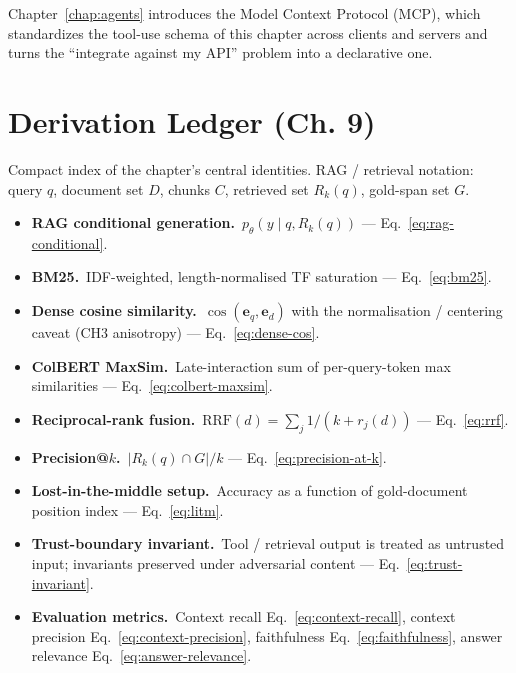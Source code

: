 Chapter~\ref{chap:agents} introduces the Model Context Protocol (MCP), which
standardizes the tool-use schema of this chapter across clients
and servers and turns the ``integrate against my API'' problem
into a declarative one.

\section*{Derivation Ledger (Ch. 9)}

\begin{derivledger}
Compact index of the chapter's central identities. RAG / retrieval
notation: query $q$, document set $D$, chunks $C$, retrieved set
$R_k(q)$, gold-span set $G$.
\begin{itemize}
  \item \textbf{RAG conditional generation.}\
        $p_\theta(y \mid q, R_k(q))$
        --- Eq.~\eqref{eq:rag-conditional}.
  \item \textbf{BM25.}\
        IDF-weighted, length-normalised TF saturation
        --- Eq.~\eqref{eq:bm25}.
  \item \textbf{Dense cosine similarity.}\
        $\cos(\mathbf{e}_q, \mathbf{e}_d)$ with the
        normalisation / centering caveat (CH3 anisotropy)
        --- Eq.~\eqref{eq:dense-cos}.
  \item \textbf{ColBERT MaxSim.}\
        Late-interaction sum of per-query-token max similarities
        --- Eq.~\eqref{eq:colbert-maxsim}.
  \item \textbf{Reciprocal-rank fusion.}\
        $\mathrm{RRF}(d) = \sum_{j} 1 / (k + r_j(d))$
        --- Eq.~\eqref{eq:rrf}.
  \item \textbf{Precision@$k$.}\
        $|R_k(q) \cap G| / k$
        --- Eq.~\eqref{eq:precision-at-k}.
  \item \textbf{Lost-in-the-middle setup.}\
        Accuracy as a function of gold-document position index
        --- Eq.~\eqref{eq:litm}.
  \item \textbf{Trust-boundary invariant.}\
        Tool / retrieval output is treated as untrusted input;
        invariants preserved under adversarial content
        --- Eq.~\eqref{eq:trust-invariant}.
  \item \textbf{Evaluation metrics.}\
        Context recall Eq.~\eqref{eq:context-recall},
        context precision Eq.~\eqref{eq:context-precision},
        faithfulness Eq.~\eqref{eq:faithfulness},
        answer relevance Eq.~\eqref{eq:answer-relevance}.
\end{itemize}
\end{derivledger}

